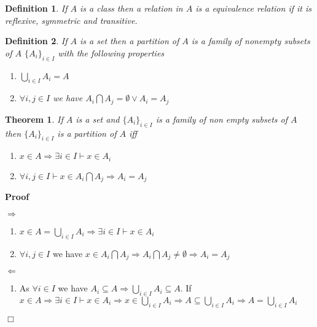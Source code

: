 \documentclass{book}
\newenvironment{proof}{\noindent\textbf{Proof\ }}{\hspace*{\fill}$\Box$\medskip}
\newtheorem{definition}{Definition}
{\theorembodyfont{\rmfamily}\newtheorem{example}{Example}}
\newtheorem{theorem}{Theorem}
\begin{document}
{{\begin{definition}
  \label{equivalence relation}{}If $A$ is a class
  then a relation in $A$ is a equivalence relation if it is reflexive,
  symmetric and transitive.
\end{definition}

\begin{definition}
  If $A$ is a set then a partition of $A$ is a family of nonempty subsets of
  $A$ $\{ A_i \}_{i \in I}$ with the following properties
  \begin{enumerate}
    \item $\bigcup_{i \in I} A_i = A$
    
    \item $\forall i, j \in I$ we have $A_i \bigcap A_j = \emptyset \vee A_i =
    A_j$
  \end{enumerate}
\end{definition}

\begin{theorem}
  \label{condition of partition}If $A$ is a set and $\{ A_i \}_{i \in I}$ is a
  family of non empty subsets of $A$ then $\{ A_i \}_{i \in I}$ is a partition
  of $A$ iff
  \begin{enumerate}
    \item $x \in A \Rightarrow \exists i \in I \vdash x \in A_i$
    
    \item $\forall i, j \in I \vdash x \in A_i \bigcap A_j \Rightarrow A_i =
    A_j$
  \end{enumerate}
\end{theorem}

\begin{proof}
  
  
  $\Rightarrow$
  \begin{enumerate}
    \item $x \in A = \bigcup_{i \in I} A_i \Rightarrow \exists i \in I \vdash
    x \in A_i$
    
    \item $\forall i, j \in I$ we have $x \in A_i \bigcap A_j \Rightarrow A_i
    \bigcap A_j \neq \emptyset \Rightarrow A_i = A_j$
  \end{enumerate}
  
  
  $\Leftarrow$
  \begin{enumerate}
    \item As $\forall i \in I$ we have $A_i \subseteq A \Rightarrow \bigcup_{i
    \in I} A_i \subseteq A$. If $x \in A \Rightarrow \exists i \in I \vdash x
    \in A_i \Rightarrow x \in \bigcup_{i \in I} A_i \Rightarrow A \subseteq
    \bigcup_{i \in I} A_i \Rightarrow A = \bigcup_{i \in I} A_i$
    

\end{enumerate}
\end{proof}}}
\end{document}
